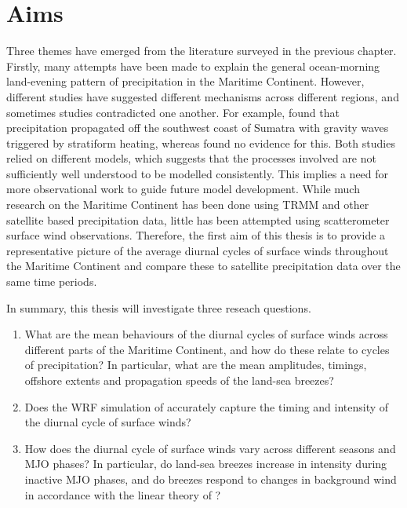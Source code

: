 \documentclass[12pt]{book}
\begin{document}
\section{Aims}
\label{Sec:Aims}
Three themes have emerged from the literature surveyed in the previous chapter. Firstly, many attempts have been made to explain the general ocean-morning land-evening pattern of precipitation in the Maritime Continent. However, different studies have suggested different mechanisms across different regions, and sometimes studies contradicted one another. For example, \citet{love11} found that precipitation propagated off the southwest coast of Sumatra with gravity waves triggered by stratiform heating, whereas \citet{wu09} found no evidence for this. Both studies relied on different models, which suggests that the processes involved are not sufficiently well understood to be modelled consistently. This implies a need for more observational work to guide future model development. While much research on the Maritime Continent has been done using TRMM and other satellite based precipitation data, little has been attempted using scatterometer surface wind observations. Therefore, the first aim of this thesis is to provide a representative picture of the average diurnal cycles of surface winds throughout the Maritime Continent and compare these to satellite precipitation data over the same time periods.         

In summary, this thesis will investigate three reseach questions.
\begin{enumerate}
\item
What are the mean behaviours of the diurnal cycles of surface winds across different parts of the Maritime Continent, and how do these relate to cycles of precipitation? In particular, what are the mean amplitudes, timings, offshore extents and propagation speeds of the land-sea breezes?    
\item
Does the WRF simulation of \citet{vincent16} accurately capture the timing and intensity of the diurnal cycle of surface winds? 
\item
How does the diurnal cycle of surface winds vary across different seasons and MJO phases? In particular, do land-sea breezes increase in intensity during inactive MJO phases, and do breezes respond to changes in background wind in accordance with the linear theory of \citet{qian09}?
\end{enumerate}

\end{document}
